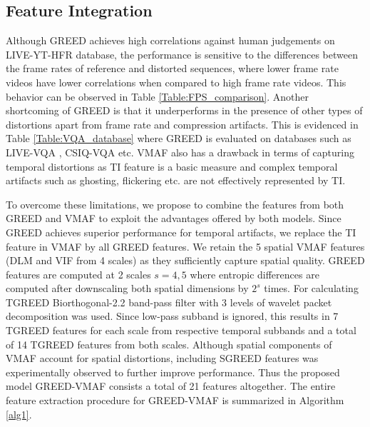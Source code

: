 \documentclass[conference]{IEEEtran}
\begin{document}
\subsection{Feature Integration}
\label{sec:feat_integration}
Although GREED achieves high correlations against human judgements on LIVE-YT-HFR database, the performance is sensitive to the differences between the frame rates of reference and distorted sequences, where lower frame rate videos have lower correlations when compared to high frame rate videos. This behavior can be observed in Table \ref{Table:FPS_comparison}. Another shortcoming of GREED is that it underperforms in the presence of other types of distortions apart from frame rate and compression artifacts. This is evidenced in Table \ref{Table:VQA_database} where GREED is evaluated on databases such as LIVE-VQA \cite{seshadrinathan2010study}, CSIQ-VQA \cite{vu2014vis3} etc. VMAF also has a drawback in terms of capturing temporal distortions as TI feature is a basic measure and complex temporal artifacts such as ghosting, flickering etc. are not effectively represented by TI.

To overcome these limitations, we propose to combine the features from both GREED and VMAF to exploit the advantages offered by both models. Since GREED achieves superior performance for temporal artifacts, we replace the TI feature in VMAF by all GREED features. We retain the 5 spatial VMAF features (DLM and VIF from 4 scales) as they sufficiently capture spatial quality. GREED features are computed at 2 scales $s=4,5$ where entropic differences are computed after downscaling both spatial dimensions by $2^s$ times. For calculating TGREED Biorthogonal-2.2 band-pass filter with 3 levels of wavelet packet decomposition \cite{coifman1992entropy} was used. Since low-pass subband is ignored, this results in 7 TGREED features for each scale from respective temporal subbands and a total of 14 TGREED features from both scales. Although spatial components of VMAF account for spatial distortions, including SGREED features was experimentally observed to further improve performance. Thus the proposed model GREED-VMAF consists a total of 21 features altogether. The entire feature extraction procedure for GREED-VMAF is summarized in Algorithm \ref{alg1}.
\end{document}
